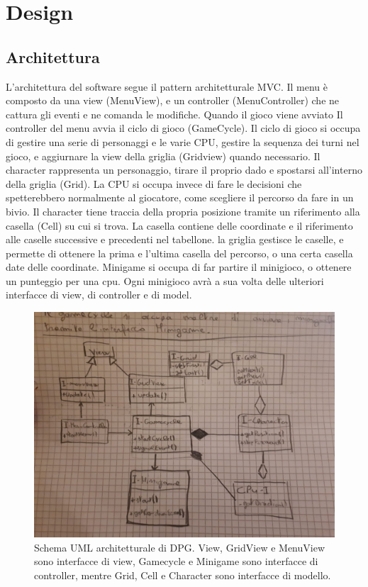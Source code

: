 \documentclass[a4paper,12pt]{report}
\begin{document}
\chapter{Design}

\section{Architettura}

L'architettura del software segue il pattern architetturale MVC.
%
Il menu è composto da una view (MenuView), e un controller (MenuController) che ne cattura gli eventi e ne comanda le modifiche.
%
Quando il gioco viene avviato Il controller del menu avvia il ciclo di gioco (GameCycle).
%
Il ciclo di gioco si occupa di gestire una serie di personaggi e le varie CPU, gestire la sequenza dei turni nel gioco, e aggiurnare la view della griglia (Gridview) quando necessario.
%
Il character rappresenta un personaggio, tirare il proprio dado e spostarsi all'interno della griglia (Grid).
%
La CPU si occupa invece di fare le decisioni che spetterebbero normalmente al giocatore, come scegliere il percorso da fare in un bivio.
%
Il character tiene traccia della propria posizione tramite un riferimento alla casella (Cell) su cui si trova.
%
La casella contiene delle coordinate e il riferimento alle caselle successive e precedenti nel tabellone.
%
la griglia gestisce le caselle, e permette di ottenere la prima e l'ultima casella del percorso, o una certa casella date delle coordinate.
%
Minigame si occupa di far partire il minigioco, o ottenere un punteggio per una cpu.
%
Ogni minigioco avrà a sua volta delle ulteriori interfacce di view, di controller e di model.

\begin{figure}[!t]
\centering{}
\includegraphics[width=\textwidth]{images/arch.jpeg}
\caption{Schema UML architetturale di DPG. View, GridView e MenuView sono interfacce di view, Gamecycle e Minigame sono interfacce di controller, mentre Grid, Cell e Character sono interfacce di modello.}
\label{img:goodarch}
\end{figure}
\end{document}
